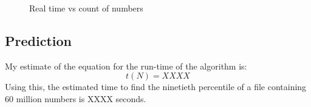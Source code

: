 \documentclass{article}
\begin{document}
 \begin{figure}
   \centering
  
   \caption{Real time vs count of numbers}
   \label{fig:experiment1}
 \end{figure}




\subsection{Prediction}
\label{sec:prediction1}

My estimate of the equation for the run-time of the algorithm is:
\begin{equation}
  \label{eq:estimated_runtime1}
  t(N) = XXXX
\end{equation}
Using this, the estimated time to find the ninetieth percentile of a
file containing 60 million numbers is XXXX seconds.
\end{document}
